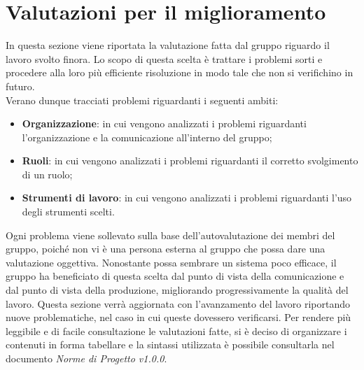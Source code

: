 \section{Valutazioni per il miglioramento}
In questa sezione viene riportata la valutazione fatta dal gruppo riguardo il 
lavoro svolto finora. Lo scopo di questa scelta è trattare i problemi sorti e
procedere alla loro più efficiente risoluzione in modo tale che non si verifichino
in futuro. \\
Verano dunque tracciati problemi riguardanti i seguenti ambiti:

\begin{itemize}
	\item \textbf{Organizzazione}: in cui vengono analizzati i problemi riguardanti 
		l'organizzazione e la comunicazione all'interno del gruppo;
	\item \textbf{Ruoli}: in cui vengono analizzati i problemi riguardanti il 
		corretto svolgimento di un ruolo;
	\item \textbf{Strumenti di lavoro}: in cui vengono analizzati i problemi riguardanti 
		l'uso degli strumenti scelti.
\end{itemize}

\noindent Ogni problema viene sollevato sulla base dell'autovalutazione dei membri del 
gruppo, poiché non vi è una persona esterna al gruppo che possa dare una valutazione
oggettiva. Nonostante possa sembrare un sistema poco efficace, il gruppo ha 
beneficiato di questa scelta dal punto di vista della comunicazione e dal punto di
vista della produzione, migliorando progressivamente la qualità del lavoro.
Questa sezione verrà aggiornata con l'avanzamento del lavoro riportando nuove 
problematiche, nel caso in cui queste dovessero verificarsi.
Per rendere più leggibile e di facile consultazione le valutazioni fatte, si è
deciso di organizzare i contenuti in forma tabellare e la sintassi utilizzata è 
possibile consultarla nel documento \textit{Norme di Progetto v1.0.0}.

